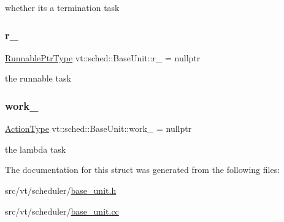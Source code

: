 whether it\textquotesingle{}s a termination task \mbox{\label{structvt_1_1sched_1_1_base_unit_a0d126796f0ee5a8e0f3304e6ca02d0fc}} 
\subsubsection{\texorpdfstring{r\+\_\+}{r\_}}
{\footnotesize\ttfamily \hyperlink{structvt_1_1sched_1_1_base_unit_ab635b72e57c53fa666d30bbfe5a0df17}{Runnable\+Ptr\+Type} vt\+::sched\+::\+Base\+Unit\+::r\+\_\+ = nullptr\hspace{0.3cm}{\ttfamily [protected]}}

the runnable task \mbox{\label{structvt_1_1sched_1_1_base_unit_ab425435c3b6c1cdf2fc208f1e50ea84c}} 
\subsubsection{\texorpdfstring{work\+\_\+}{work\_}}
{\footnotesize\ttfamily \hyperlink{namespacevt_ae0a5a7b18cc99d7b732cb4d44f46b0f3}{Action\+Type} vt\+::sched\+::\+Base\+Unit\+::work\+\_\+ = nullptr\hspace{0.3cm}{\ttfamily [protected]}}

the lambda task 

The documentation for this struct was generated from the following files\+:\begin{DoxyCompactItemize}
\item 
src/vt/scheduler/\hyperlink{base__unit_8h}{base\+\_\+unit.\+h}\item 
src/vt/scheduler/\hyperlink{base__unit_8cc}{base\+\_\+unit.\+cc}\end{DoxyCompactItemize}
